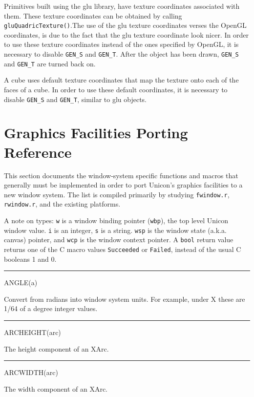 Primitives built using the glu library, have texture coordinates
associated with them. These texture coordinates can be obtained by
calling \texttt{gluQuadricTexture()}.The use of the glu texture
coordinates verses the OpenGL coordinates, is due to the fact that the
glu texture coordinate look nicer. In order to use these texture
coordinates instead of the ones specified by OpenGL, it is necessary
to disable \texttt{GEN\_S} and \texttt{GEN\_T}. After the object has
been drawn, \texttt{GEN\_S} and \texttt{GEN\_T} are turned back on.

A cube uses default texture coordinates that map the texture onto each
of the faces of a cube. In order to use these default coordinates, it
is necessary to disable \texttt{GEN\_S} and \texttt{GEN\_T}, similar
to glu objects.

\section{Graphics Facilities Porting Reference}

This section documents the window-system specific functions and macros
that generally must be implemented in order to port Unicon's graphics
facilities to a new window system. The list is compiled primarily by
studying \texttt{fwindow.r}, \texttt{rwindow.r}, and the existing
platforms.


A note on types: \texttt{w} is a window binding pointer
(\texttt{wbp}), the top level Unicon
{\textquotedbl}window{\textquotedbl} value. \texttt{i} is an integer,
\texttt{s} is a string. \texttt{wsp} is the window state
(a.k.a. canvas) pointer, and \texttt{wcp} is the window context
pointer. A \texttt{bool} return value returns one of the C macro
values \texttt{Succeeded} or \texttt{Failed}, instead of the usual C
booleans 1 and 0.


{\sffamily\bfseries
\bigskip\hrule\vspace{0.1cm}
\noindent
ANGLE(a)}


Convert from radians into window system units. For example, under X
these are 1/64 of a degree integer values.

{\sffamily\bfseries
\bigskip\hrule\vspace{0.1cm}
\noindent
ARCHEIGHT(arc)}


The height component of an XArc.

{\sffamily\bfseries
\bigskip\hrule\vspace{0.1cm}
\noindent
ARCWIDTH(arc)}


The width component of an XArc.

